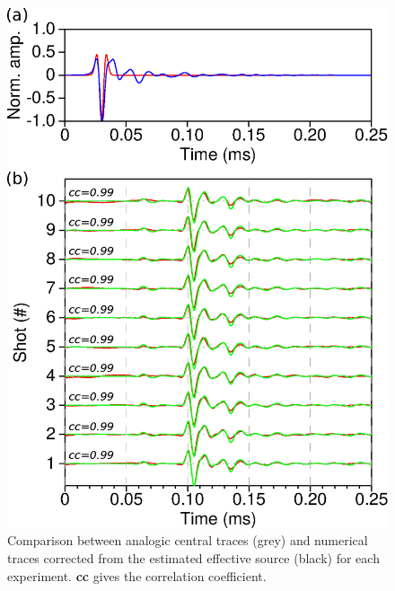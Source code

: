 \documentclass[manuscript,revised]{geophysics}
\begin{document}
\begin{figure}[!h]
	\centering
	\includegraphics[scale=0.5]{fig/spec_F50_CT_COMP.eps}
	\caption{Comparison between analogic central traces (grey) and numerical traces corrected from the estimated effective source (black) for each experiment. \textbf{cc} gives the correlation coefficient.}
	\label{panel_srcest_2d_mean_comp}
\end{figure}

\end{document}
